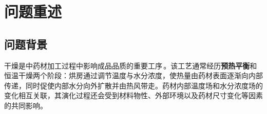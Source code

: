 \documentclass[12pt,a4paper,fontset=none]{ctexart}
\newcommand{\problem}[1]{\par\noindent\hspace*{2em}\textbf{针对问题#1}\quad}
\begin{document}
\begin{abstract}
\problem{三}在问题二基础之上，将烘干完成条件定义为全场最大含水率低于目标阈值。在 BDF 求解器中设置终止事件，并将仿真时间延长至所有径向节点均满足阈值。数值结果显示，药材中心的水分浓度始终最大，是决定烘干时长的控制位置。取首个严格达标的 $60\,\mathrm{s}$ 输出时刻，最终烘干时间为\textbf{\boldmath$57.5833\,\mathrm h$}。此时各指定位置的水分浓度为\textbf{\boldmath$\bm C_{\mathrm{dry}}=(0.1500,\allowbreak\,0.1477,\allowbreak\,0.1402,\allowbreak\,0.1250,\allowbreak\,0.0525)\,\mathrm{kg/kg}$}，依次对应 $r=(0,\,0.5,\,1.0,\,1.5,\,2.0)\,\mathrm{cm}$。

\problem{四}该问题需同时考虑药材失水引起的径向收缩。引入无量纲坐标 $\xi=r/R(t)$（$0\le \xi\le 1$），将随时间变化的物理区域映射至固定计算区间。坐标变换后，在热传导与水分扩散方程中加入网格运动项 $\xi\dot R(t)/R(t)$ 及尺度因子 $1/R^2(t)$，结合附录四给出的物性关系，在固定 $\xi$ 网格上继续采用有限体积法与 BDF 求解，并以 $\max_i C_i<\textbf{0.15}\,\mathrm{kg/kg}$ 作为终止条件。为区分物性变化与几何收缩的影响，通过控制“物性”和“收缩”设置了三组方案。得到的最终达标时刻为\textbf{\boldmath$52.7167\,\mathrm h$}。与问题三相比，烘干时长缩短\textbf{\boldmath$4.8667\,\mathrm h$}，降幅为\textbf{\boldmath$8.45\%$}；与采用附录四物性但保持固定半径的对照模型相比，烘干时长缩短\textbf{\boldmath$77.3000\,\mathrm h$}，降幅为\textbf{\boldmath$59.45\%$}，干燥速度提高至原来的\textbf{\boldmath$2.466$}倍。结果说明，径向收缩通过缩短水分扩散距离显著提高了烘干效率。

最后给出了建模过程的误差分析和结果检验，本文结论正确合理，具有一定的应用价值和普适性。

\vspace{0.6em}
\noindent\textbf{关键词：热质耦合；有限体积法；BDF；非线性扩散；移动边界；药材烘干}
\end{abstract}
\clearpage

\section{问题重述}

\subsection{问题背景}

干燥是中药材加工过程中影响成品品质的重要工序\,\cite{mujumdar}。该工艺通常经历\textbf{预热平衡}和恒温干燥两个阶段：烘房通过调节温度与水分浓度，使热量由药材表面逐渐向内部传递，同时促使内部水分向外扩散并由热风带走。药材内部温度场和水分浓度场的变化相互关联，其演化过程还会受到材料物性、外部环境以及药材尺寸变化等因素的共同影响。
\end{document}
